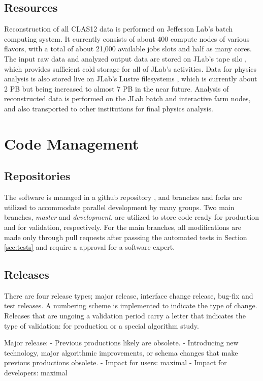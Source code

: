 \documentclass[3p,times,twocolumn]{elsarticle}
\begin{document}
\subsection{Resources}
Reconstruction of all CLAS12 data is performed on Jefferson Lab's batch computing system\cite{jlab-batch-farm}.  It currently consists of about 400 compute nodes of various flavors, with a total of about 21,000 available jobs slots and half as many cores.  The input raw data and analyzed output data are stored on JLab's tape silo \cite{jlab-tape-silo}, which provides sufficient cold storage for all of JLab's activities.  Data for physics analysis is also stored live on JLab's Lustre filesystems \cite{jlab-lustre}, which is currently about 2 PB but being increased to almost 7 PB in the near future.  Analysis of reconstructed data is performed on the JLab batch and interactive farm nodes, and also transported to other institutions for final physics analysis.

\section{Code Management}

\subsection{Repositories}
The software is managed in a github repository \cite{recon-github}, and branches and forks are utilized to accommodate parallel development by many groups.  Two main branches, {\it master} and {\it development}, are utilized to store code ready for production and for validation, respectively. For the main branches, all modifications are made only through pull requests after passsing the automated tests in Section \ref{sec:tests} and require a approval  for a software expert.

\subsection{Releases}
There are four release types; major release, interface change release, bug-fix
and test releases.  A numbering scheme is implemented to indicate the type of change.
Releases that are ungoing a validation period carry a letter that indicates the type of validation:
for production or a special algorithm study.

Major release:
- Previous productions likely are obsolete.
- Introducing new technology, major algorithmic improvements, or
schema changes that make previous productions obsolete.
- Impact for users: maximal
- Impact for developers: maximal
\end{document}

